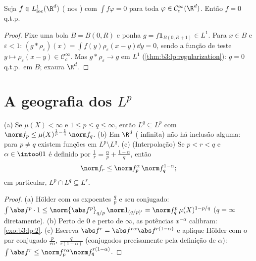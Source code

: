 \begin{corollary}\label{cor:b3:lp:fundlemma}
Seja $f \in L^1_{\mathrm{loc}}(\R^d)$ ( nos ) com $\int f\varphi = 0$ para toda $\varphi \in \mathcal
C^\infty_c(\R^d)$. Então
$f = 0$ q.t.p.
\end{corollary}

\begin{proof}
Fixe uma bola $B = B(0, R)$ e ponha $g = f\mathbf 1_{B(0, R+1)}
\in L^1$. Para $x \in B$ e $\varepsilon < 1$: $(g *
\rho_\varepsilon)(x) = \int f(y)\rho_\varepsilon(x - y)\dd y =
0$, sendo a
função de teste $y \mapsto \rho_\varepsilon(x-y)
\in \mathcal C_c^\infty$. Mas $g * \rho_\varepsilon \to g$ em $L^1$ (\cref{thm:b3:lp:regularization}):
$g = 0$ q.t.p.\ em $B$; exaura $\R^d$.
\end{proof}

\section{A geografia dos \texorpdfstring{$L^p$}{Lp}}

\begin{proposition}\label{prop:b3:lp:inclusions}
(a) Se $\mu(X) < \infty$ e $1 \leq p \leq q \leq \infty$, então $L^q \subseteq L^p$ com $\norm f_p \leq
\mu(X)^{\frac1p - \frac1q}\,\norm f_q$.
(b) Em $\R^d$ ( infinita) não há inclusão alguma: para $p \neq q$
existem funções em $L^p\setminus L^q$.
(c) (Interpolação) Se $p < r < q$ e $\alpha \in \intoo01$ é definido por $\frac1r = \frac\alpha p + \frac{1 - \alpha}q$, então
\[
\norm f_r \leq \norm f_p^{\alpha}\,\norm f_q^{1 - \alpha} ;
\]
em particular, $L^p \cap L^q \subseteq L^r$.
\end{proposition}

\begin{proof}
(a) Hölder com os expoentes $\frac qp$ e seu conjugado: $\int\abs f^p\cdot 1 \leq \norm{\abs f^p}_{q/p}\,\norm
1_{(q/p)'} = \norm f_q^p\,\mu(X)^{1 - p/q}$ ($q = \infty$
diretamente). (b) Perto de $0$ e perto de $\infty$, as potências
$x^{-\alpha}$ calibram: \cref{exo:b3:lp:2}. (c) Escreva $\abs f^r = \abs
f^{r\alpha}\abs f^{r(1-\alpha)}$ e aplique Hölder com o
par conjugado $\frac p{r\alpha}$, $\frac q{r(1-\alpha)}$ (conjugados precisamente pela definição de
$\alpha$): $\int\abs f^r \leq \norm f_p^{r\alpha}\norm f_q^{r(1 -
\alpha)}$.
\end{proof}

